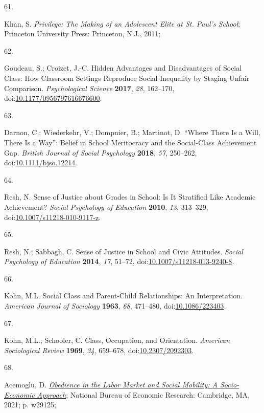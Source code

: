 \documentclass[
  12pt,
  letterpaper,
]{article}
\newlength{\cslhangindent}
\newlength{\csllabelwidth}
\newenvironment{CSLReferences}[2] %
 {\begin{list}{}{%
  \setlength{\itemindent}{0pt}
  \setlength{\leftmargin}{0pt}
  \setlength{\parsep}{0pt}
  \ifodd #1
   \setlength{\leftmargin}{\cslhangindent}
   \setlength{\itemindent}{-1\cslhangindent}
  \fi
  \setlength{\itemsep}{#2\baselineskip}}}
 {\end{list}}
\newcommand{\CSLLeftMargin}[1]{\parbox[t]{\csllabelwidth}{\strut#1\strut}}
\newcommand{\CSLRightInline}[1]{\parbox[t]{\linewidth - \csllabelwidth}{\strut#1\strut}}
\begin{document}
\begin{CSLReferences}{0}{0}
\CSLLeftMargin{61. }%
\CSLRightInline{Khan, S. \emph{Privilege: {The Making} of an {Adolescent
Elite} at {St}. {Paul}'s {School}}; Princeton University Press:
Princeton, N.J., 2011;}

\CSLLeftMargin{62. }%
\CSLRightInline{Goudeau, S.; Croizet, J.-C. Hidden {Advantages} and
{Disadvantages} of {Social Class}: {How Classroom Settings Reproduce
Social Inequality} by {Staging Unfair Comparison}. \emph{Psychological
Science} \textbf{2017}, \emph{28}, 162--170,
doi:\href{https://doi.org/10.1177/0956797616676600}{10.1177/0956797616676600}.}

\CSLLeftMargin{63. }%
\CSLRightInline{Darnon, C.; Wiederkehr, V.; Dompnier, B.; Martinot, D.
{``{Where} There Is a Will, There Is a Way''}: {Belief} in School
Meritocracy and the Social-Class Achievement Gap. \emph{British Journal
of Social Psychology} \textbf{2018}, \emph{57}, 250--262,
doi:\href{https://doi.org/10.1111/bjso.12214}{10.1111/bjso.12214}.}

\CSLLeftMargin{64. }%
\CSLRightInline{Resh, N. Sense of Justice about Grades in School: Is It
Stratified Like Academic Achievement? \emph{Social Psychology of
Education} \textbf{2010}, \emph{13}, 313--329,
doi:\href{https://doi.org/10.1007/s11218-010-9117-z}{10.1007/s11218-010-9117-z}.}

\CSLLeftMargin{65. }%
\CSLRightInline{Resh, N.; Sabbagh, C. Sense of Justice in School and
Civic Attitudes. \emph{Social Psychology of Education} \textbf{2014},
\emph{17}, 51--72,
doi:\href{https://doi.org/10.1007/s11218-013-9240-8}{10.1007/s11218-013-9240-8}.}

\CSLLeftMargin{66. }%
\CSLRightInline{Kohn, M.L. Social {Class} and {Parent-Child
Relationships}: {An Interpretation}. \emph{American Journal of
Sociology} \textbf{1963}, \emph{68}, 471--480,
doi:\href{https://doi.org/10.1086/223403}{10.1086/223403}.}

\CSLLeftMargin{67. }%
\CSLRightInline{Kohn, M.L.; Schooler, C. Class, {Occupation}, and
{Orientation}. \emph{American Sociological Review} \textbf{1969},
\emph{34}, 659--678,
doi:\href{https://doi.org/10.2307/2092303}{10.2307/2092303}.}

\CSLLeftMargin{68. }%
\CSLRightInline{Acemoglu, D.
\emph{\href{https://doi.org/10.3386/w29125}{Obedience in the {Labor
Market} and {Social Mobility}: {A Socio-Economic Approach}}}; National
Bureau of Economic Research: Cambridge, MA, 2021; p. w29125;}


\end{CSLReferences}
\end{document}
